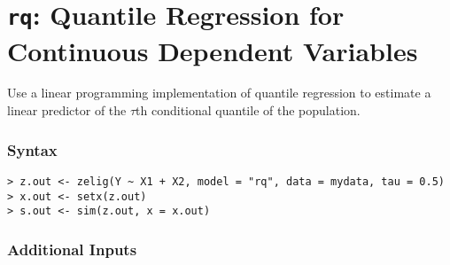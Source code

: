 \section{{\tt rq}: Quantile Regression for Continuous
Dependent Variables}
\label{ls}

Use a linear programming implementation of quantile regression to
estimate a linear predictor of the $\tau$th conditional quantile of the
population.

\subsubsection{Syntax}

\begin{verbatim}
> z.out <- zelig(Y ~ X1 + X2, model = "rq", data = mydata, tau = 0.5)
> x.out <- setx(z.out)
> s.out <- sim(z.out, x = x.out)
\end{verbatim}

\subsubsection{Additional Inputs}  

